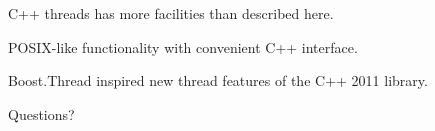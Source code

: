 \documentclass[landscape]{slides}
\begin{document}

\begin{citemize}
\item C++ threads has more facilities than described here.
\item POSIX-like functionality with convenient C++ interface.
\item Boost.Thread inspired new thread features of the C++ 2011 library.
\end{citemize}
\vspace{0.5in}
\centerline{Questions?}
\stopslide
\end{document}
